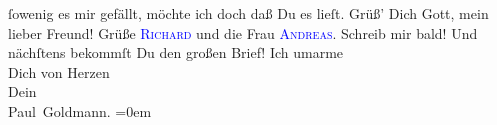                ſowenig es mir gefällt, möchte {\pb}ich doch daß Du es
               lieſt.\pend
           \pstart
           Grüß’ Dich Gott, mein lieber Freund! Grüße \textsc{\textcolor{blue}{Richard}{}\ledrightnote{\textcolor{blue}{Richard Beer-Hofmann}}} und die Frau \textsc{\textcolor{blue}{Andreas}{}\ledrightnote{\textcolor{blue}{Lou Andreas-Salomé}}}.\pend
           \pstart
           Schreib mir bald! Und nächſtens bekommſt Du den großen Brief!\pend
           \pstart
           Ich umarme {\\[\baselineskip]}Dich von Herzen {\\[\baselineskip]}Dein {\\[\baselineskip]}\spacefill\mbox{Paul Goldmann.}\pend
           \leftskip=0em{}\endnumbering{}  
      